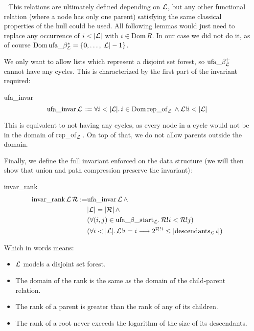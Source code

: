 \documentclass[headsepline,footsepline,footinclude=false,oneside,fontsize=11pt,paper=a4,listof=totoc,bibliography=totoc]{scrbook} %
\begin{document}
\HandPencilLeft\,\, This relations are ultimately defined depending on $\mathcal{L}$, but any other functional relation (where a node has only one parent) satisfying the same classical properties of the hull could be used. All following lemmas would just need to replace any occurrence of $i < |\mathcal{L}|$ with $i \in \mathrm{Dom}\, R$. In our case we did not do it, as of course $\mathrm{Dom}\, \mathrm{ufa\_}\beta^*_\mathcal{L} = \{0, \dots, |\mathcal{L}| - 1\}$.

We only want to allow lists which represent a disjoint set forest, so $\mathrm{ufa\_}\beta^+_\mathcal{L}$ cannot have any cycles. This is characterized by the first part of the invariant required:

\begin{definition}{ufa\_invar}
	\begin{equation}
	\mathrm{ufa\_invar} \, \mathcal{L} \, := \forall i < |\mathcal{L}|.\, i \in \mathrm{Dom}\, \mathrm{rep\_of}_\mathcal{L}\, \land \mathcal{L}!i < |\mathcal{L}|
	\end{equation}
	
\end{definition}

This is equivalent to not having any cycles, as every node in a cycle would not be in the domain of $\mathrm{rep\_of}_\mathcal{L}\,$. On top of that, we do not allow parents outside the domain.

Finally, we define the full invariant enforced on the data structure (we will then show that union and path compression preserve the invariant):

\begin{definition}{invar\_rank}
\begin{align}
\mathrm{invar\_rank}\, \mathcal{L} \, \mathcal{R} := 
&\mathrm{ufa\_invar} \, \mathcal{L} \, \land \\
&|\mathcal{L}| = |\mathcal{R}| \, \land \\
&(\forall (i,j) \in \mathrm{ufa\_}\beta\mathrm{\_start}_\mathcal{L}. \, \mathcal{R}!i < \mathcal{R}!j) \\
&(\forall i < |\mathcal{L}|.\, \mathcal{L}!i = i \longrightarrow 2^{\mathcal{R}!i} \leq |\mathrm{descendants}_{\mathcal{L}} \, i|)
\end{align}
\end{definition}

Which in words means: 
\begin{itemize}
	\item $\mathcal{L}$ models a disjoint set forest.
	\item The domain of the rank is the same as the domain of the child-parent relation.
	\item The rank of a parent is greater than the rank of any of its children.
	\item The rank of a root never exceeds the logarithm of the size of its descendants.
\end{itemize}
\end{document}
